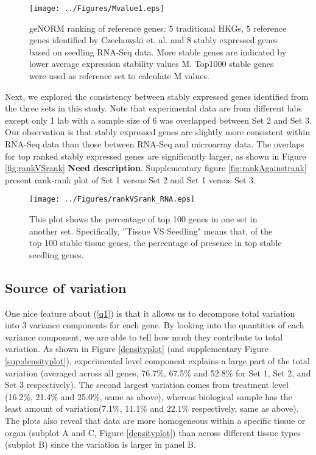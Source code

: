 \documentclass[11pt, a4paper]{article}
\begin{document}
 \begin{figure}[h!]
\begin{center}
\texttt{[image: ../Figures/Mvalue1.eps]}
\caption{\label{mvalue} geNORM ranking of reference genes: 5 traditional HKGs, 5 reference genes identified by Czechowski et. al. and 8 stably expressed genes based on seedling RNA-Seq data.  More stable genes are indicated by lower average expression stability values M. Top1000 stable genes were used as reference set to calculate M values.   }
\end{center}
\end{figure}

Next, we explored the consistency between stably expressed genes identified from the three sets in this study. Note that experimental data are from different labs except only 1 lab with a sample size of 6 was overlapped between Set 2 and Set 3. Our observation is that stably expressed genes are slightly more consistent within RNA-Seq data than those between RNA-Seq and microarray data.  The overlaps for top ranked stably expressed genes are significantly larger, as shown in Figure \ref{fig:rankVSrank} \textbf{Need description}. Supplementary figure \ref{fig:rankAgainstrank} present rank-rank plot of Set 1 versus Set 2 and Set 1 versus Set 3.  

 \begin{figure}[h!]
\begin{center}
\texttt{[image: ../Figures/rankVSrank\_RNA.eps]}
\caption{\label{rankVSrank_RNA} This plot shows the percentage of top 100 genes in one set  in another set. Specifically, ''Tissue VS Seedling" means that, of the top 100 stable tissue genes, the percentage of presence in top stable seedling genes.}
\end{center}
\end{figure}



  \subsection{Source of variation}
 One nice feature about (\ref{q1}) is that it allows us to decompose total variation into 3 variance components for each gene. By looking into the quantities of each variance component, we are able to tell how much they contribute to total variation.  As shown in Figure \ref{densityplot} (and supplementary Figure \ref{sup:densityplot}), experimental level component explains a large part of the total variation (averaged across all genes, 76.7\%, 67.5\% and 52.8\%  for Set 1, Set 2, and Set 3 respectively).  The second largest variation comes from treatment level (16.2\%, 21.4\% and 25.0\%, same as above), whereas biological sample has the least amount of variation(7.1\%, 11.1\% and 22.1\% respectively, same as above).  The plots also reveal that data are more homogeneous within a specific tissue or organ (subplot A and C, Figure \ref{densityplot}) than across different tissue types (subplot B) since the variation is larger in panel B.  
\end{document}
